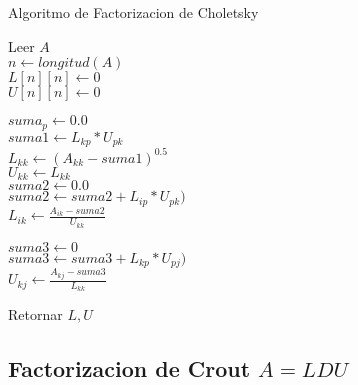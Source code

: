 \documentclass[12pt]{article}
\begin{document}
        \begin{algorithm}[H]
            \caption{Algoritmo de Factorizacion de Choletsky}
            Leer $A$\\
            $n \leftarrow longitud(A)$\\
            $L[n][n] \leftarrow 0$\\
            $U[n][n] \leftarrow 0$\\
            {
                $suma_p \leftarrow 0.0$\\
                {
                    $suma1 \leftarrow L_{kp} * U_{pk}$\\
                }
                $L_{kk} \leftarrow (A_{kk} - suma1)^{0.5}$\\
                $U_{kk} \leftarrow L_{kk}$\\
                {
                    $suma2 \leftarrow 0.0$\\
                    {
                        $suma2 \leftarrow suma2 + L_{ip} * U_{pk})$\\
                    }
                    $L_{ik} \leftarrow \frac{A_{ik} - suma2}{U_{kk}}$\\
                }

                {
                    $suma3 \leftarrow 0$\\
                    {
                        $suma3 \leftarrow suma3 + L_{kp} * U_{pj})$\\
                    }
                    $U_{kj} \leftarrow \frac{A_{kj} - suma3}{L_{kk}}$\\
                }

            }
            Retornar $L, U$

        \end{algorithm}

        \subsection{Factorizacion de Crout $A = LDU$}
        
\end{document}
